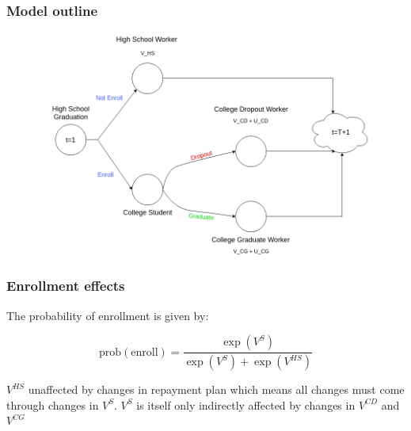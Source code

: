 \documentclass[10pt]{beamer}
\begin{document}
  \begin{frame} \frametitle{Model outline}

    \begin{figure}
      \begin{center}
       \includegraphics[width=\textwidth]{../ms/images/StudentLoans/LifeCycleChart.png}
      \end{center}
    \end{figure}

  \end{frame}

  \begin{frame} \frametitle{Enrollment effects}

    The probability of enrollment is given by:

    $$\text{prob}(\text{enroll}) = \frac{\exp(V^{S})}{\exp(V^{S}) + \exp(V^{HS})}$$

    $V^{HS}$ unaffected by changes in repayment plan which means all changes must come through
    changes in $V^{S}$. $V^{S}$ is itself only indirectly affected by changes in $V^{CD}$ and
    $V^{CG}$

  \end{frame}
\end{document}
